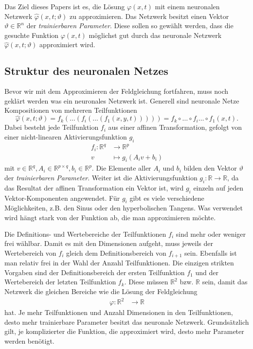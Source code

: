 Das Ziel dieses Papers ist es, die Lösung $\varphi(x, t)$ mit einem neuronalen Netzwerk $\hat{\varphi}(x, t; \vartheta)$ zu approximieren.
Das Netzwerk besitzt einen Vektor \( \vartheta \in \mathbb{R}^n \) der \emph{trainierbaren Parameter}.
Diese sollen so gewählt werden, dass die gesuchte Funktion $\varphi(x, t)$ möglichst gut durch das neuronale Netzwerk $\hat{\varphi}(x, t; \vartheta)$ approximiert wird.


\subsection{Struktur des neuronalen Netzes}\label{neuronal:subsection:struktur_nn}
Bevor wir mit dem Approximieren der Feldgleichung fortfahren, muss noch geklärt werden was ein neuronales Netzwerk ist.
Generell sind neuronale Netze Kompositionen von mehreren Teilfunktionen
\begin{equation}
    \hat{\varphi}(x, t; \vartheta) = f_k(\ldots(f_i(\ldots(f_1(x, y, t))))) = f_k \circ \ldots \circ f_i \ldots \circ f_1(x, t).
    \label{neuronal:nn_ausformuliert}
\end{equation}
Dabei besteht jede Teilfunktion \( f_i \) aus einer affinen Transformation, gefolgt von einer nicht-linearen Aktivierungsfunktion \( g_i \)
\begin{align*}
    f_i\colon \mathbb{R}^q & \longrightarrow\mathbb{R}^p \\[-1ex]
    v & \longmapsto g_i(A_iv + b_i)
\end{align*}
mit \( v \in \mathbb{R}^q, A_i \in \mathbb{R}^{p \times q}, b_i \in \mathbb{R}^p \). 
Die Elemente aller \( A_i \) und \( b_i \) bilden den Vektor \( \vartheta \) der \emph{trainierbaren Parameter}.
Weiter ist die Aktivierungsfunktion \( g_i\colon \mathbb{R} \longrightarrow\mathbb{R} \), da das Resultat der affinen Transformation ein Vektor ist, wird \( g_i \) einzeln auf jeden Vektor-Komponenten angewendet.
Für \( g_i \) gibt es viele verschiedene Möglichkeiten, z.B. den Sinus oder den hyperbolischen Tangens.
Was verwendet wird hängt stark von der Funktion ab, die man approximieren möchte.

Die Definitions- und Wertebereiche der Teilfunktionen \( f_i \) sind mehr oder weniger frei wählbar.
Damit es mit den Dimensionen aufgeht, muss jeweils der Wertebereich von \( f_i \) gleich dem Definitionsbereich von \( f_{i+1} \) sein.
Ebenfalls ist man relativ frei in der Wahl der Anzahl Teilfunktionen.
Die einzigen strikten Vorgaben sind der Definitionsbereich der ersten Teilfunktion \( f_1 \) und der Wertebereich der letzten Teilfunktion \( f_k \).
Diese müssen \( \mathbb{R}^2 \) bzw. \( \mathbb{R} \) sein, damit das Netzwerk die gleichen Bereiche wie die Lösung der Feldgleichung
\begin{align*}
    \varphi\colon \mathbb{R}^2 & \longrightarrow\mathbb{R}
\end{align*}
hat.
Je mehr Teilfunktionen und Anzahl Dimensionen in den Teilfunktionen, desto mehr trainierbare Parameter besitzt das neuronale Netzwerk.
Grundsätzlich gilt, je komplizierter die Funktion, die approximiert wird, desto mehr Parameter werden benötigt.

